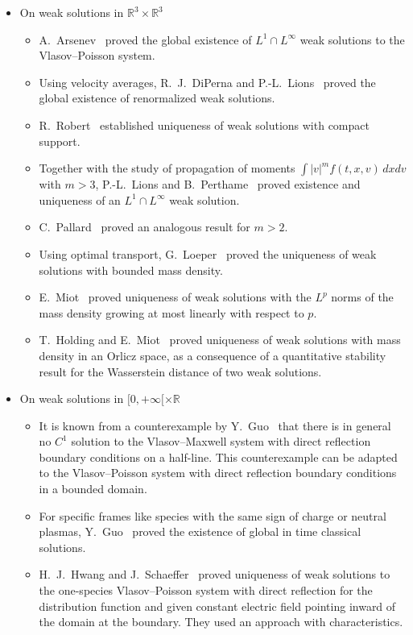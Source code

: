\documentclass[AHL,Unicode,longabstracts,published]{cedram}
\newcommand{\R}{\mathbb{R}}
\begin{document}
\begin{itemize}
\item On weak solutions in $\R ^3\times \R ^3$
\begin{itemize}
\item[-] A.~Arsenev~\cite{Ars75} proved the global existence of $L^1\cap L^\infty $ weak solutions to the Vlasov--Poisson system.
\item[-] Using velocity averages, R.~J.~DiPerna and P.-L.~Lions~\cite{DL88} proved the global existence of renormalized weak solutions.
\item[-] R.~Robert~\cite{Rob97} established uniqueness of weak solutions with compact support.
\item[-] Together with the study of propagation of moments $\int |v|^m f(t,x,v) \, dx dv$ with $m>3$, P.-L.~Lions and B.~Perthame~\cite{LP91} proved existence and uniqueness of an $L^1 \cap L^{\infty}$ weak solution. 
\item[-] C.~Pallard~\cite{Pal12} proved an analogous result for $m>2$.
\item[-] Using optimal transport, G.~Loeper~\cite{Loe06} proved the uniqueness of weak solutions with bounded mass density.
\item[-] E.~Miot~\cite{Mio16} proved uniqueness of weak solutions with the $L^p$ norms of the mass density growing at most linearly with respect to $p$.
\item[-] T.~Holding and E.~Miot~\cite{HM18} proved uniqueness of weak solutions with mass density in an Orlicz space, as a consequence of a quantitative stability result for the Wasserstein distance of two weak solutions.
\end{itemize}
\vspace{4pt}
\item On weak solutions in $[0,+\infty [\times \R $
\begin{itemize}
\item[-] It is known from a counterexample by Y.~Guo~\cite{Guo95} that there is in general no $C^1$ solution to the Vlasov--Maxwell system with direct reflection boundary conditions on a half-line. This counterexample can be adapted to the Vlasov--Poisson system with direct reflection boundary conditions in a bounded domain.
\item[-] For specific frames like species with the same sign of charge or neutral plasmas, Y.~Guo~\cite{Guo94} proved the existence of global in time classical solutions.
\item[-] H.~J.~Hwang and J.~Schaeffer~\cite{HS08} proved uniqueness of weak solutions to the one-species Vlasov--Poisson system with direct reflection for the distribution function and given constant electric field pointing inward of the domain at the boundary. They used an approach with characteristics.

\end{itemize}
\end{itemize}
\end{document}

